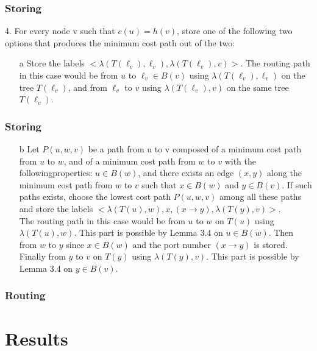 \documentclass[10pt, compress]{beamer}
\begin{document}
\begin{frame}[fragile]
  \frametitle{Storing}
    4. For every node v such that $c(u) = h(v)$, store one of the following two options that produces the minimum cost path out of the two:

    \begin{enumerate}
    \item[a] Store the labels $<\lambda(T (\ell_v), \ell_v ), \lambda(T (\ell_v), v)>$. The routing path in this case would be from $u$ to $\ell_v \in B(v)$ using $\lambda(T (\ell_v), \ell_v)$ on the tree $T (\ell_v)$, and from $\ell_v$ to $v$ using $\lambda(T (\ell_v), v)$ on the same tree $T (\ell_v)$.
    \end{enumerate}


\end{frame}

\begin{frame}[fragile]
  \frametitle{Storing}
    \begin{enumerate}
    \item[b] Let $P(u, w, v)$ be a path from u to v composed of a minimum cost path from $u$ to $w$, and of a minimum cost path from $w$ to $v$ with the followingproperties: $u \in B(w)$, and there exists an edge $(x, y)$ along the minimum cost path from $w$ to $v$ such that $x \in B(w)$ and $y \in B(v)$. If such paths exists, choose the lowest cost path $P(u, w, v)$ among all these paths and store the labels $<\lambda(T (u), w), x, (x → y), \lambda(T (y), v)>$.\\
    The routing path in this case would be from $u$ to $w$ on $T(u)$ using $\lambda(T (u), w)$. This part is possible by Lemma 3.4 on $u \in B(w)$. Then from $w$ to $y$ since $x \in B(w)$ and the port number $(x \rightarrow y)$ is stored. Finally from $y$ to $v$ on $T(y)$ using $\lambda(T (y), v)$. This part is possible by Lemma 3.4   on $y \in B(v)$.
    \end{enumerate}

\end{frame}




\begin{frame}[fragile]
  \frametitle{Routing}


\end{frame}


\section{Results}
\end{document}

